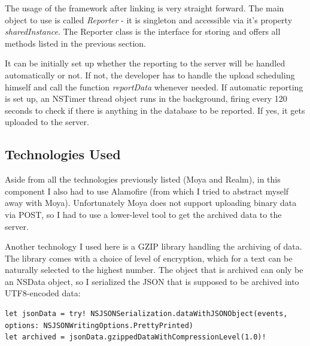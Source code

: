 The usage of the framework after linking is very straight forward. The main object to use is called \emph{Reporter} - it is singleton and accessible via it's property \emph{sharedInstance}. The Reporter class is the interface for storing and offers all methods listed in the previous section.

It can be initially set up whether the reporting to the server will be handled automatically or not. If not, the developer has to handle the upload scheduling himself and call the function \emph{reportData} whenever needed. If automatic reporting is set up, an NSTimer thread object runs in the background, firing every 120 seconds to check if there is anything in the database to be reported. If yes, it gets uploaded to the server.

\subsection{Technologies Used}

Aside from all the technologies previously listed (Moya and Realm), in this component I also had to use Alamofire (from which I tried to abstract myself away with Moya). Unfortunately Moya does not support uploading binary data via POST, so I had to use a lower-level tool to get the archived data to the server.

Another technology I used here is a GZIP \cite{deutsch1996gzip} library handling the archiving of data. The library comes with a choice of level of encryption, which for a text can be naturally selected to the highest number. The object that is archived can only be an NSData object, so I serialized the JSON that is supposed to be archived into UTF8-encoded data:

\bigbreak

\begin{lstlisting}
let jsonData = try! NSJSONSerialization.dataWithJSONObject(events, options: NSJSONWritingOptions.PrettyPrinted)
let archived = jsonData.gzippedDataWithCompressionLevel(1.0)!
\end{lstlisting}	

